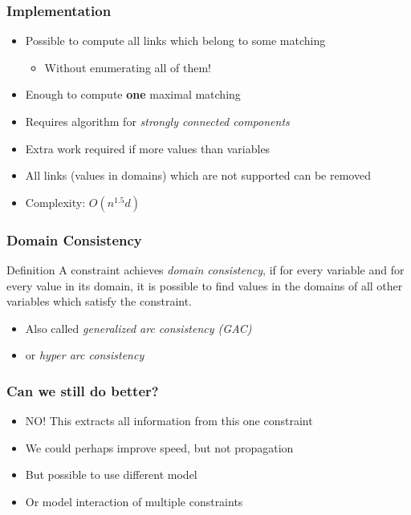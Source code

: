 \documentclass{beamer}
\begin{document}
\begin{frame}
\frametitle{Implementation}
\begin{itemize}
\item Possible to compute all links which belong to some matching
\begin{itemize}
\item Without enumerating all of them!
\end{itemize}
\item Enough to compute {\bf one} maximal matching
\item Requires algorithm for {\em strongly connected components}
\item Extra work required if more values than variables
\item All links (values in domains) which are not supported can be removed
\item Complexity: $O(n^{1.5}d)$
\end{itemize}
\end{frame}

\begin{frame}
\frametitle{Domain Consistency}
\begin{block}{Definition}
A constraint achieves {\em domain consistency}, if for every variable and for every value in its domain, it is possible to find values in the domains of all other variables which satisfy the constraint.
\end{block}
\begin{itemize}
\item Also called {\em generalized arc consistency (GAC)}
\item or {\em hyper arc consistency}
\end{itemize}
\end{frame}

\begin{frame}
\frametitle{Can we still do better?}
\begin{itemize}
\item NO! This extracts all information from this one constraint
\item We could perhaps improve speed, but not propagation
\item But possible to use different model
\item Or model interaction of multiple constraints
\end{itemize}
\end{frame}
\end{document}
